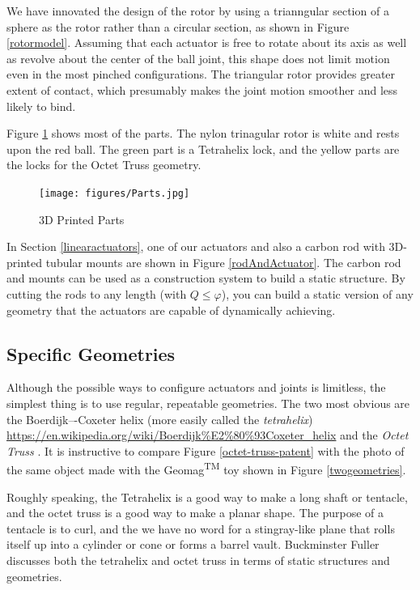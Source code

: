 \documentclass[11pt]{article}
\begin{document}
 We have innovated the design of the rotor by using a trianngular section of a sphere as the
 rotor rather than a circular section, as shown in Figure \ref{rotormodel}.
 Assuming that each actuator is free to rotate about its axis as well as revolve about the
 center of the ball joint, this shape does not limit motion even in the most pinched
 configurations. The triangular rotor provides greater extent of contact,
 which presumably makes the joint motion
 smoother and less likely to bind.
 

 Figure \ref{parts} shows most of the parts. The nylon trinagular rotor is white and rests upon
 the red ball. The green part is a Tetrahelix lock, and the yellow parts are the locks for the Octet Truss
 geometry.

\begin{figure}[H]
  \centering
    \texttt{[image: figures/Parts.jpg]}
    \caption[3D Printed Parts]{3D Printed Parts}
      \label{parts}
\end{figure}

In Section \ref{linearactuators}, one of our actuators and also a carbon rod with 3D-printed tubular mounts
are shown in Figure \ref{rodAndActuator}.
The carbon rod and mounts can be used as a construction system to build a static structure.
By cutting the rods to any length (with $Q \leq \varphi$), you can build a static version of any geometry that
the actuators
are capable of dynamically achieving.

\subsection{Specific Geometries}

Although the possible ways to configure actuators and joints is limitless, the simplest thing is to
use regular, repeatable geometries. The two most obvious are the Boerdijk–-Coxeter helix
(more easily called the \textit{tetrahelix})
\url{https://en.wikipedia.org/wiki/Boerdijk%E2%80%93Coxeter_helix}
  and the \emph{Octet Truss}
  \cite{richard1961synergetic}.
  It is instructive to compare Figure \ref{octet-truss-patent} with the photo of the same object
  made with the Geomag\textsuperscript{TM} toy shown in Figure \ref{twogeometries}.
    
Roughly speaking, the Tetrahelix is a good way to make a long shaft or tentacle, and the octet truss
is a good way to make a planar shape. The purpose of a tentacle is to curl, and the we have no word for
a stingray-like plane that rolls itself up into a cylinder or cone or forms a barrel vault. Buckminster Fuller discusses
both the tetrahelix and octet truss \cite{fuller1982synergetics} in terms of static structures and geometries.
\end{document}

